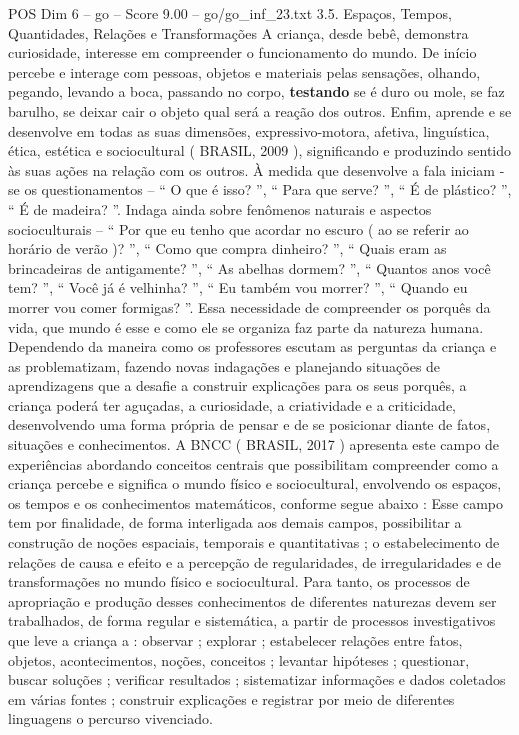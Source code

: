 \begin{textsample}{POS Dim 6 – go – Score 9.00 – go/go\_inf\_23.txt}  \label{ex:f6_pos_114}
3.5.
Espaços, Tempos, Quantidades, Relações e Transformações A criança, desde bebê, demonstra curiosidade, interesse em compreender o funcionamento do mundo.
De início percebe e interage com pessoas, objetos e materiais pelas sensações, olhando, pegando, levando a boca, passando no corpo, \textbf{testando} se é duro ou mole, se faz barulho, se deixar cair o objeto qual será a reação dos outros.
Enfim, aprende e se desenvolve em todas as suas dimensões, expressivo-motora, afetiva, linguística, ética, estética e sociocultural ( BRASIL, 2009 ), significando e produzindo sentido às suas ações na relação com os outros.
À medida que desenvolve a fala iniciam -se os questionamentos – “ O que é isso? ”, “ Para que serve? ”, “ É de plástico? ”, “ É de madeira? ”.
Indaga ainda sobre fenômenos naturais e aspectos socioculturais – “ Por que eu tenho que acordar no escuro ( ao se referir ao horário de verão )? ”, “ Como que compra dinheiro? ”, “ Quais eram as brincadeiras de antigamente? ”, “ As abelhas dormem? ”, “ Quantos anos você tem? ”, “ Você já é velhinha? ”, “ Eu também vou morrer? ”, “ Quando eu morrer vou comer formigas? ”.
Essa necessidade de compreender os porquês da vida, que mundo é esse e como ele se organiza faz parte da natureza humana.
Dependendo da maneira como os professores escutam as perguntas da criança e as problematizam, fazendo novas indagações e planejando situações de aprendizagens que a desafie a construir explicações para os seus porquês, a criança poderá ter aguçadas, a curiosidade, a criatividade e a criticidade, desenvolvendo uma forma própria de pensar e de se posicionar diante de fatos, situações e conhecimentos.
A BNCC ( BRASIL, 2017 ) apresenta este campo de experiências abordando conceitos centrais que possibilitam compreender como a criança percebe e significa o mundo físico e sociocultural, envolvendo os espaços, os tempos e os conhecimentos matemáticos, conforme segue abaixo : Esse campo tem por finalidade, de forma interligada aos demais campos, possibilitar a construção de noções espaciais, temporais e quantitativas ; o estabelecimento de relações de causa e efeito e a percepção de regularidades, de irregularidades e de transformações no mundo físico e sociocultural.
Para tanto, os processos de apropriação e produção desses conhecimentos de diferentes naturezas devem ser trabalhados, de forma regular e sistemática, a partir de processos investigativos que leve a criança a : observar ; explorar ; estabelecer relações entre fatos, objetos, acontecimentos, noções, conceitos ; levantar hipóteses ; questionar, buscar soluções ; verificar resultados ; sistematizar informações e dados coletados em várias fontes ; construir explicações e registrar por meio de diferentes linguagens o percurso vivenciado.

\end{textsample}
